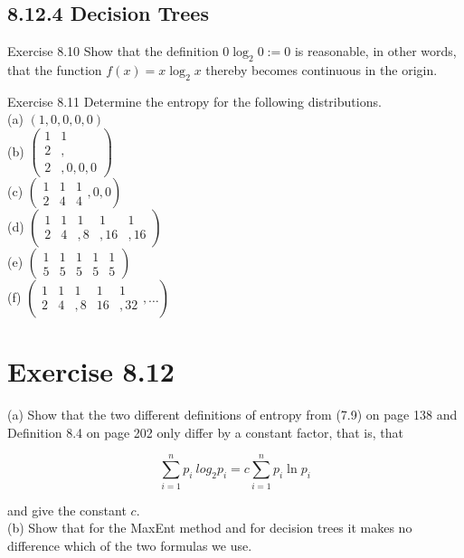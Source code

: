 \documentclass[10pt]{article}
\begin{document}
\subsection*{8.12.4 Decision Trees}
Exercise 8.10 Show that the definition $0 \log _{2} 0:=0$ is reasonable, in other words, that the function $f(x)=x \log _{2} x$ thereby becomes continuous in the origin.

Exercise 8.11 Determine the entropy for the following distributions.\\
(a) $(1,0,0,0,0)$\\
(b) $\left(\begin{array}{ll}1 & 1 \\ 2 & , \\ 2 & , 0,0,0\end{array}\right)$\\
(c) $\left(\begin{array}{ccc}1 & 1 & 1 \\ 2 & 4 & 4\end{array}, 0,0\right)$\\
(d) $\left(\begin{array}{ccccc}1 & 1 & 1 & 1 & 1 \\ 2 & 4 & , 8 & , 16 & , 16\end{array}\right)$\\
(e) $\left(\begin{array}{ccccc}1 & 1 & 1 & 1 & 1 \\ 5 & 5 & 5 & 5 & 5\end{array}\right)$\\
(f) $\left(\begin{array}{ccccc}1 & 1 & 1 & 1 & 1 \\ 2 & 4 & , 8 & 16 & , 32\end{array}, \ldots\right)$

\section*{Exercise 8.12}
(a) Show that the two different definitions of entropy from (7.9) on page 138 and Definition 8.4 on page 202 only differ by a constant factor, that is, that

$$
\sum_{i=1}^{n} p_{i} \
log _{2} p_{i}=c \sum_{i=1}^{n} p_{i} \ln p_{i}
$$

and give the constant $c$.\\
(b) Show that for the MaxEnt method and for decision trees it makes no difference which of the two formulas we use.
\end{document}
